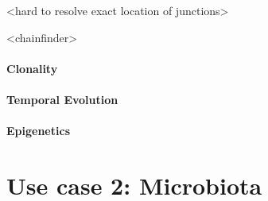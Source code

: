 <hard to resolve exact location of junctions>

<chainfinder>
\paragraph{Clonality}
\paragraph{Temporal Evolution}
\paragraph{Epigenetics}


\newpage
\section{Use case 2: Microbiota}

